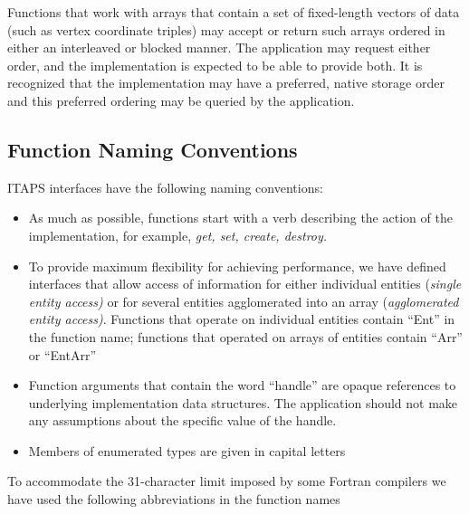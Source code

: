 \documentclass{article}
\begin{document}
Functions that work with arrays that contain a set of fixed-length 
vectors of data (such as vertex coordinate triples) may accept 
or return such arrays ordered in either an interleaved or blocked 
manner. The application may request either order, and the implementation 
is expected to be able to provide both. It is recognized that 
the implementation may have a preferred, native storage order 
and this preferred ordering may be queried by the application.


\subsection{Function Naming Conventions}

ITAPS interfaces have the following naming conventions:
\begin{itemize}
\item As much as possible, functions start with a verb describing the 
action of the implementation, for example, \textit{get, set, create, 
destroy.}

\item To provide maximum flexibility for achieving performance, we 
have defined interfaces that allow access of information for 
either individual entities (\textit{single entity access)} or for 
several entities agglomerated into an array (\textit{agglomerated 
entity access)}. Functions that operate on individual entities 
contain ``Ent'' in the function name; functions that operated 
on arrays of entities contain ``Arr'' or ``EntArr''

\item Function arguments that contain the word ``handle'' are 
opaque references to underlying implementation data structures. 
The application should not make any assumptions about the specific 
value of the handle.

\item Members of enumerated types are given in capital letters
\end{itemize}

To accommodate the 31-character limit imposed by some Fortran 
compilers we have used the following abbreviations in the function 
names
\end{document}
